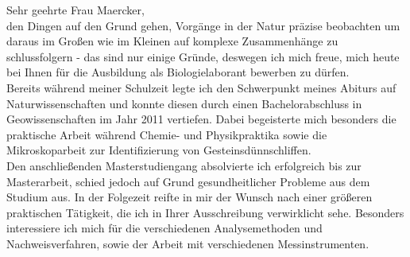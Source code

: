 \documentclass[11pt,a4paper,roman]{moderncv}
\begin{document}
Sehr geehrte Frau Maercker,\\
den Dingen auf den Grund gehen, Vorgänge in der Natur präzise beobachten um daraus im Großen wie im Kleinen auf komplexe Zusammenhänge zu schlussfolgern - das sind nur einige Gründe, deswegen ich mich freue, mich heute bei Ihnen für die Ausbildung als Biologielaborant bewerben zu dürfen.\\
\vspace{5mm}
Bereits während meiner Schulzeit legte ich den Schwerpunkt meines Abiturs auf Naturwissenschaften und konnte diesen durch einen Bachelorabschluss in Geowissenschaften im Jahr 2011 vertiefen. Dabei begeisterte mich besonders die praktische Arbeit während Chemie- und Physikpraktika sowie die Mikroskoparbeit zur Identifizierung von Gesteinsdünnschliffen.\\
Den anschließenden Masterstudiengang absolvierte ich erfolgreich bis zur Masterarbeit, schied jedoch auf Grund gesundheitlicher Probleme aus dem Studium aus. In der Folgezeit reifte in mir der Wunsch nach einer größeren praktischen Tätigkeit, die ich in Ihrer Ausschreibung verwirklicht sehe.
Besonders interessiere ich mich für die verschiedenen Analysemethoden und Nachweisverfahren, sowie der  Arbeit mit verschiedenen Messinstrumenten.\\
\vspace{5mm}
\end{document}
